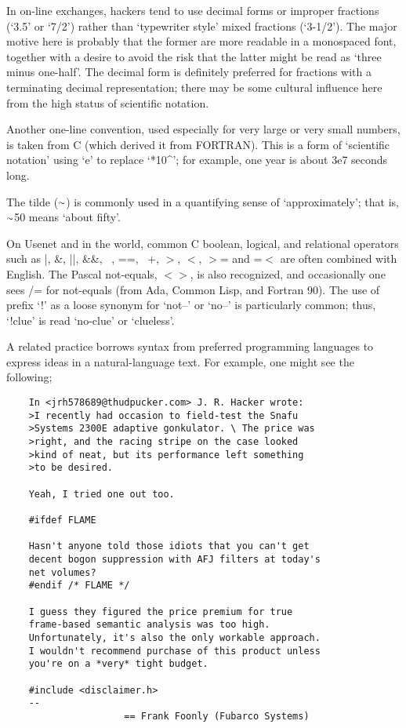 In on-line exchanges, hackers tend to use decimal forms or improper fractions
(`3.5' or `7/2') rather than `typewriter style' mixed fractions (`3-1/2'). The
major motive here is probably that the former are more readable in a monospaced
font, together with a desire to avoid the risk that the latter might be read as
`three minus one-half'. The decimal form is definitely preferred for fractions
with a terminating decimal representation; there may be some cultural influence
here from the high status of scientific notation.

Another one-line convention, used especially for very large or very small
numbers, is taken from C (which derived it from FORTRAN). This is a form of
`scientific notation' using `e' to replace `*10\^{}'; for example, one year is
about 3e7 seconds long.

The tilde ($\Tilde$) is commonly used in a quantifying sense of
`approximately'; that is, $\Tilde$50 means `about fifty'.

On Usenet and in the  world, common C boolean, logical, and
relational operators such as |, \&, ||, \&\&, ~, ==, ~+, $>$, $<$, $>$= and
=$<$ are often combined with English. The Pascal not-equals, $<$$>$, is also
recognized, and occasionally one sees /= for not-equals (from Ada, Common Lisp,
and Fortran 90). The use of prefix `!' as a loose synonym for `not--' or `no--'
is particularly common; thus, `!clue' is read `no-clue' or `clueless'.

A related practice borrows syntax from preferred programming languages to
express ideas in a natural-language text. For example, one might see the
following;

\begin{verbatim}
	In <jrh578689@thudpucker.com> J. R. Hacker wrote:
	>I recently had occasion to field-test the Snafu
	>Systems 2300E adaptive gonkulator. \ The price was
	>right, and the racing stripe on the case looked
	>kind of neat, but its performance left something
	>to be desired.

	Yeah, I tried one out too.
	
	#ifdef FLAME

	Hasn't anyone told those idiots that you can't get
	decent bogon suppression with AFJ filters at today's
	net volumes?
	#endif /* FLAME */

	I guess they figured the price premium for true
	frame-based semantic analysis was too high.
	Unfortunately, it's also the only workable approach.
	I wouldn't recommend purchase of this product unless
	you're on a *very* tight budget.

	#include <disclaimer.h>
	--
	                 == Frank Foonly (Fubarco Systems)
\end{verbatim}

